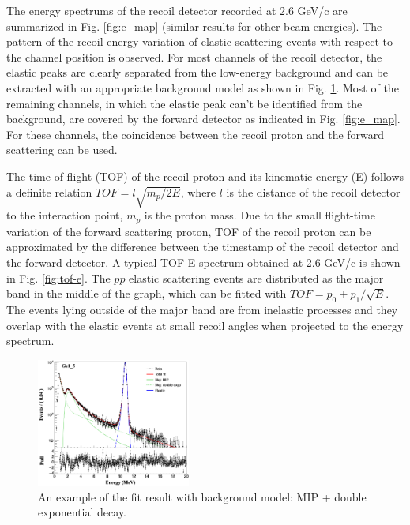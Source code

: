 \documentclass[number,5p]{elsarticle}
\begin{document}
The energy spectrums of the recoil detector recorded at 2.6 GeV/c are
summarized in Fig. \ref{fig:e_map} (similar results for other beam energies). 
The pattern of the recoil energy variation of elastic scattering events with respect to the channel position is observed.
For most channels of the recoil detector, the elastic peaks are clearly
separated from the low-energy background
and can be extracted with an appropriate background model as shown in Fig. \ref{fig:e_fit}.
Most of the remaining channels, in which the elastic peak can't be identified from the
background, are covered by the forward detector as indicated in Fig. \ref{fig:e_map}.
For these channels, the coincidence between the recoil proton and the forward
scattering can be used.

The time-of-flight (TOF) of the recoil proton and its kinematic energy (E)
follows a definite relation $TOF = l\sqrt{m_p/2E}$, where $l$ is the distance of
the recoil detector to the interaction point, $m_p$ is the proton mass.
Due to the small flight-time variation of the forward scattering proton, TOF of the recoil proton can be approximated by the difference
between the timestamp of the recoil detector and the forward detector.
A typical TOF-E spectrum obtained at 2.6 GeV/c is shown in Fig. \ref{fig:tof-e}. 
The $pp$ elastic scattering events are distributed as the major band in the
middle of the graph, which can be fitted with \(TOF = p_{0} + p_{1}/{\sqrt{E}}\).
The events lying outside of the major band are from inelastic processes and
they overlap with the elastic events at small recoil angles when projected to the energy spectrum.

\begin{figure}[htbp]
  \centering
  \includegraphics[width=0.45\textwidth]{./e_fit.png}
  \caption{An example of the fit result with background model: MIP + double
    exponential decay.}
  \label{fig:e_fit}
\end{figure}
\end{document}
